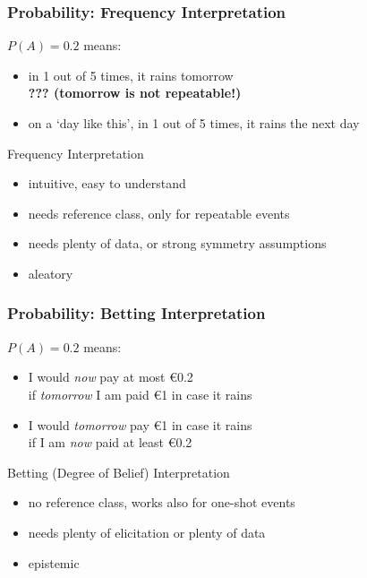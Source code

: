 \documentclass{beamer}
\newcommand{\gplus}{\structure{\textbf{+}}}
\newcommand{\gmins}{\structure{\textbf{--}}}
\newcommand{\gexcl}{\structure{\rule{0.3ex}{0ex}\textbf{!}\rule{0.3ex}{0ex}}}
\begin{document}
\begin{frame}
  \frametitle{Probability: Frequency Interpretation}
  $P(A)=0.2$ means:
  \begin{itemize}
  \item in 1 out of 5 times, it rains tomorrow \\
    \textbf{??? (tomorrow is not repeatable!)}
  \item on a `day like this', in 1 out of 5 times, it rains the next day
  \end{itemize}
  \begin{block}{Frequency Interpretation}
    \begin{itemize}
    \item[\gplus] intuitive, easy to understand
    \item[\gmins] needs \alert{reference class}, only for \alert{repeatable events}
    \item[\gmins] needs plenty of data, or strong symmetry assumptions
    \item[\gexcl] aleatory
    \end{itemize}
  \end{block}
\end{frame}

\begin{frame}
  \frametitle{Probability: Betting Interpretation}
  $P(A)=0.2$ means:
  \begin{itemize}
  \item I would \textit{now} pay at most \euro 0.2 \\
    if \textit{tomorrow} I am paid \euro 1 in case it rains
  \item I would \textit{tomorrow} pay \euro 1 in case it rains \\
    if I am \textit{now} paid at least \euro 0.2
  \end{itemize}
  \begin{center}
  \end{center}
  \vspace*{-1.5ex}
  \begin{block}{Betting (Degree of Belief) Interpretation}
    \begin{itemize}
    \item[\gplus] no reference class, works also for \alert{one-shot events}
    \item[\gmins] needs plenty of elicitation or plenty of data
    \item[\gexcl] epistemic
    \end{itemize}
  \end{block}
\end{frame}
\end{document}
